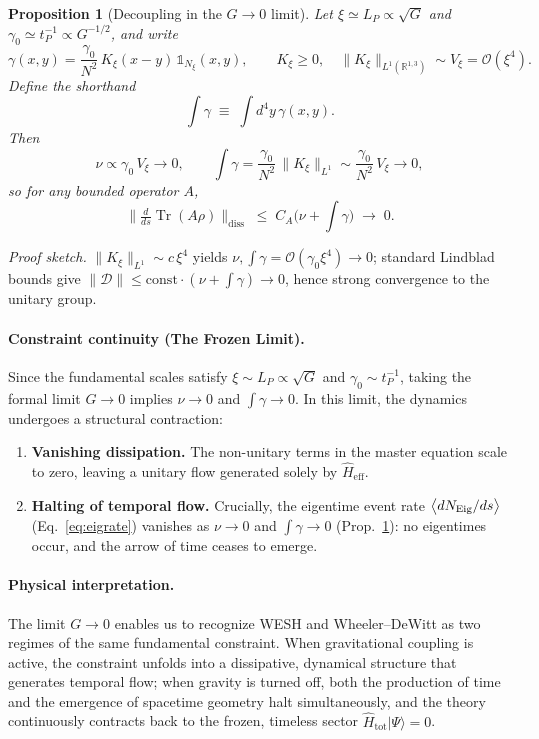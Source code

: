 \documentclass[12pt,a4paper]{article}
\newtheorem{proposition}{Proposition}[section]
\renewcommand{\Tr}{\operatorname{Tr}}
\numberwithin{equation}{section}
\begin{document}
\begin{proposition}[Decoupling in the $G\!\to\!0$ limit]
\label{prop:Gto0}
Let $\xi\simeq L_P\propto\sqrt{G}$ and
$\gamma_0\simeq t_P^{-1}\propto G^{-1/2}$, and write
\[
\gamma(x,y)=\frac{\gamma_0}{N^2}\,K_\xi(x-y)\,
\mathbb{1}_{N_\xi}(x,y),\qquad
K_\xi\ge0,\quad \|K_\xi\|_{L^1(\mathbb{R}^{1,3})}\sim V_\xi=\mathcal O(\xi^4) .
\]
Define the shorthand
\[
\int\!\gamma \;\equiv\; \int d^4y\,\gamma(x,y).
\]
Then
\[
\nu\propto \gamma_0\,V_\xi \to 0,\qquad
\int\!\gamma=\frac{\gamma_0}{N^2}\,\|K_\xi\|_{L^1}
\sim \frac{\gamma_0}{N^2}\,V_\xi \to 0,
\]
so for any bounded operator $A$,
\[
\Big\|\tfrac{d}{ds}\Tr(A\rho)\Big\|_{\mathrm{diss}}
\;\le\; C_A\big(\nu+\!\int\!\gamma\big)\;\to\;0.
\]
\end{proposition}

\noindent\emph{Proof sketch.} $\|K_\xi\|_{L^1}\sim c\,\xi^4$ yields
$\nu,\int\gamma=\mathcal{O}(\gamma_0\xi^4)\to 0$; standard Lindblad bounds
give $\|\mathcal{D}\|\le \mathrm{const}\cdot(\nu+\int\gamma)\to 0$, hence
strong convergence to the unitary group.

\paragraph{Constraint continuity (The Frozen Limit).}
Since the fundamental scales satisfy $\xi \sim L_P \propto \sqrt{G}$ and 
$\gamma_0 \sim t_P^{-1}$, taking the formal limit $G\to 0$ implies 
$\nu\to 0$ and $\int\gamma\to 0$. In this limit, the dynamics undergoes 
a structural contraction:
\begin{enumerate}[label=(\roman*),leftmargin=1.5em]
\item \textbf{Vanishing dissipation.} The non-unitary terms in the master 
equation scale to zero, leaving a unitary flow generated solely by 
$\hat{H}_{\mathrm{eff}}$.
\item \textbf{Halting of temporal flow.} Crucially, the eigentime event
rate $\big\langle dN_{\rm Eig}/ds\big\rangle$ (Eq.~\ref{eq:eigrate})
vanishes as $\nu\to 0$ and $\int\gamma\to 0$ (Prop.~\ref{prop:Gto0}):
no eigentimes occur, and the arrow of time ceases to emerge.
\end{enumerate}

\paragraph{Physical interpretation.}
The limit $G\to 0$ enables us to recognize WESH and Wheeler--DeWitt as 
two regimes of the same fundamental constraint. When gravitational coupling 
is active, the constraint unfolds into a dissipative, dynamical structure 
that generates temporal flow; when gravity is turned off, both the production 
of time and the emergence of spacetime geometry halt simultaneously, and the 
theory continuously contracts back to the frozen, timeless sector 
$\hat{H}_{\mathrm{tot}}|\Psi\rangle=0$. 
\end{document}
